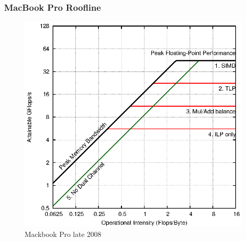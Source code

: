 \documentclass[a4paper,10pt,openright,openbib,twocolumn]{article}
\begin{document}
\subsubsection{MacBook Pro Roofline}
\begin{figure}[!htp]
	\centering
	\begin{minipage}[t]{\columnwidth}
		\includegraphics[width=\textwidth]{images/roofline_mbp.eps}
		\caption{Mackbook Pro late 2008 \label{fig:roofline1}}
	\end{minipage}
\end{figure}
\end{document}
